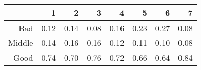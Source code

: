 \begin{table}[ht]
\centering
\begin{tabular}{rrrrrrrr}
  \hline
 & 1 & 2 & 3 & 4 & 5 & 6 & 7 \\ 
  \hline
Bad & 0.12 & 0.14 & 0.08 & 0.16 & 0.23 & 0.27 & 0.08 \\ 
  Middle & 0.14 & 0.16 & 0.16 & 0.12 & 0.11 & 0.10 & 0.08 \\ 
  Good & 0.74 & 0.70 & 0.76 & 0.72 & 0.66 & 0.64 & 0.84 \\ 
   \hline
\end{tabular}
\end{table}
